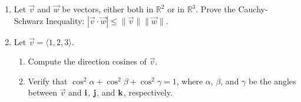 \documentclass[12pt]{article}
\newif\ifans
\begin{document}
\begin{enumerate}
\item Let $\overrightarrow{v}$ and $\overrightarrow{w}$ be vectors, either both in $\mathbb{R}^2$ or in $\mathbb{R}^3$.  Prove the Cauchy-Schwarz Inequality: $|\overrightarrow{v}\cdot \overrightarrow{w}|\leq \|\overrightarrow{v}\|\|\overrightarrow{w}\|$.

\ifans{\fbox{\parbox{1\linewidth}{
Suppose that $\theta$ is the angle between $\overrightarrow{v}$ and $\overrightarrow{w}$.  Then:
\begin{align*}
|\overrightarrow{v}\cdot\overrightarrow{w}|&=\left|\|\overrightarrow{v}\|\|\overrightarrow{w}\|\cos{\theta}\right|\\
&=\left(\|\overrightarrow{v}\|\right)\left(\|\overrightarrow{w}\|\right)\left(|\cos{\theta}|\right)\\
&\leq\left(\|\overrightarrow{v}\|\right)\left(\|\overrightarrow{w}\|\right)(1)\\
&=\|\overrightarrow{v}\| \|\overrightarrow{w}\|
\end{align*}
Thus, $|\overrightarrow{v}\cdot \overrightarrow{w}|\leq \|\overrightarrow{v}\|\|\overrightarrow{w}\|$, as promised.
}}} \fi

\item Let $\overrightarrow{v}=\langle 1,2,3 \rangle$.

\begin{enumerate}

\item Compute the direction cosines of $\overrightarrow{v}$.

\ifans{\fbox{\parbox{1\linewidth}{Let $\alpha$, $\beta$, and $\gamma$ be the angles between $\overrightarrow{v}$ and ${\bf i}$, ${\bf j}$, and ${\bf k}$, respectively.  Then:\\ $\cos{\alpha}=\frac{1}{\sqrt{14}}$, $\cos{\beta}=\frac{2}{\sqrt{14}}$, and $\cos{\gamma}=\frac{3}{\sqrt{14}}$}}} \fi

\item Verify that $\cos^2\alpha+\cos^2\beta+\cos^2\gamma=1$, where $\alpha$, $\beta$, and $\gamma$ be the angles between $\overrightarrow{v}$ and ${\bf i}$, ${\bf j}$, and ${\bf k}$, respectively.

\ifans{\fbox{\parbox{1\linewidth}{Using the information from part (a), we obtain:
\begin{align*}
\cos^2\alpha+\cos^2\beta+\cos^2\gamma&=\left(\frac{1}{\sqrt{14}}\right)^2+\left(\frac{2}{\sqrt{14}}\right)^2+\left(\frac{3}{\sqrt{14}}\right)^2\\
&=\frac{1}{14}+\frac{4}{14}+\frac{9}{14}\\
&=1
\end{align*}
}}} \fi

\end{enumerate}

\end{enumerate}
\end{document}
